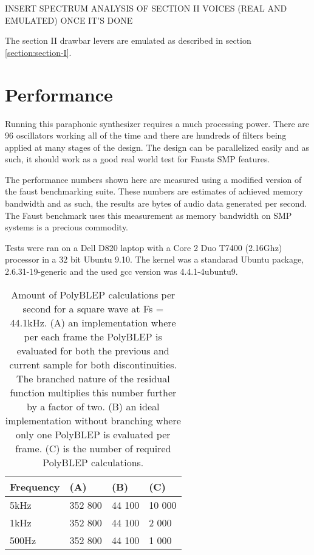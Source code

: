 \documentclass[11pt,a4paper]{article}
\begin{document}

INSERT SPECTRUM ANALYSIS OF SECTION II VOICES (REAL AND EMULATED) ONCE IT'S DONE

The section II drawbar levers are emulated as described in section \ref{section:section-I}.

\section{Performance}

Running this paraphonic synthesizer requires a much processing power. There are 96 oscillators working all of the time and there are hundreds of filters being applied at many stages of the design. The design can be parallelized easily and as such, it should work as a good real world test for Fausts SMP features.

The performance numbers shown here are measured using a modified version of the faust benchmarking suite. These numbers are estimates of achieved memory bandwidth and as such, the results are bytes of audio data generated per second. The Faust benchmark uses this measurement as memory bandwidth on SMP systems is a precious commodity.

Tests were ran on a Dell D820 laptop with a Core 2 Duo T7400 (2.16Ghz) processor in a 32 bit Ubuntu 9.10. The kernel was a standarad Ubuntu package, 2.6.31-19-generic and the used gcc version was 4.4.1-4ubuntu9.

\begin{table}[h]
 \begin{center}
\begin{tabular}{|l|l|l|l|}

      \hline
      Frequency & (A)        &  (B)         & (C) \\
      \hline\hline
      5kHz     & 352 800     & 44 100       & 10 000\\
      1kHz     & 352 800     & 44 100       &  2 000\\
      500Hz    & 352 800     & 44 100       &  1 000\\
      \hline

\end{tabular}
\caption{Amount of PolyBLEP calculations per second for a square wave at Fs = 44.1kHz. 
(A) an implementation where per each frame the PolyBLEP is evaluated for both the previous and current sample for both discontinuities. The branched nature of the residual function multiplies this number further by a factor of two.
(B) an ideal implementation without branching where only one PolyBLEP is evaluated per frame.
(C) is the number of required PolyBLEP calculations.  }\label{table:polyblep-amount}
 \end{center}
\end{table}
\end{document}
